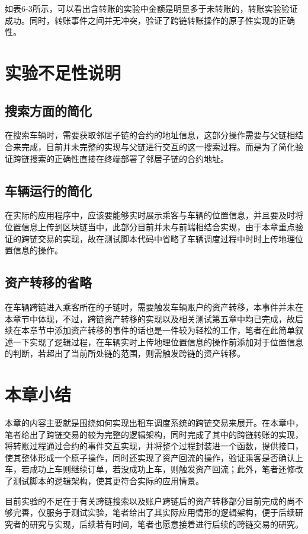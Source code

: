 如表6-3所示，可以看出含转账的实验中金额是明显多于未转账的，转账实验验证成功。同时，转账事件之间并无冲突，验证了跨链转账操作的原子性实现的正确性。

\section{实验不足性说明}

\subsection{搜索方面的简化}

在搜索车辆时，需要获取邻居子链的合约的地址信息，这部分操作需要与父链相结合来完成，目前并未完整的实现与父链进行交互的这一搜索过程。而是为了简化验证跨链搜索的正确性直接在终端部署了邻居子链的合约地址。

\subsection{车辆运行的简化}

在实际的应用程序中，应该要能够实时展示乘客与车辆的位置信息，并且要及时将位置信息上传到区块链当中，此部分目前并未与前端相结合实现，由于本章重点验证的跨链交易的实现，故在测试脚本代码中省略了车辆调度过程中时时上传地理位置信息的操作。

\subsection{资产转移的省略}

在车辆跨链进入乘客所在的子链时，需要触发车辆账户的资产转移，本事件并未在本章节中体现，不过，跨链资产转移的实现以及相关测试第五章中均已完成，故后续在本章节中添加资产转移的事件的话也是一件较为轻松的工作，笔者在此简单叙述一下实现了逻辑过程，在车辆实时上传地理位置信息的操作前添加对于位置信息的判断，若超出了当前所处链的范围，则需触发跨链的资产转移。

\section{本章小结}

本章的内容主要就是围绕如何实现出租车调度系统的跨链交易来展开。在本章中，笔者给出了跨链交易的较为完整的逻辑架构，同时完成了其中的跨链转账的实现，将转账过程通过合约的事件交互实现，并将整个过程封装进一个函数，提供接口，使其整体形成一个原子操作，同时还实现了资产回流的操作，验证乘客是否确认上车，若成功上车则继续订单，若没成功上车，则触发资产回流；此外，笔者还修改了测试脚本的逻辑架构，使其更符合实际的应用情景。

目前实验的不足在于有关跨链搜索以及账户跨链后的资产转移部分目前完成的尚不够完善，仅服务于测试实验，笔者给出了其实际应用情形的逻辑架构，便于后续研究者的研究与实现，后续若有时间，笔者也愿意接着进行后续的跨链交易的研究。
